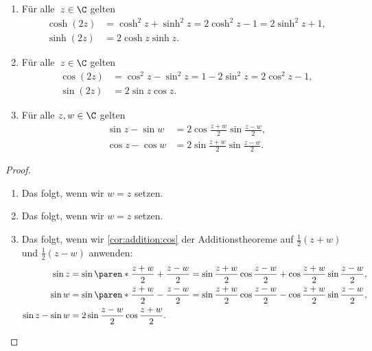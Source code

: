 \documentclass[a4paper]{article}
\begin{document}
\begin{corollary}[Doopelwinkelfunktionen]\leavevmode
    \begin{enumerate}
        \item Für alle~$z \in \C$ gelten
              \begin{align*}
                  \cosh(2z) & = \cosh^2z + \sinh^2z = 2\cosh^2z - 1 = 2\sinh^2z + 1, \\
                  \sinh(2z) & = 2\cosh z\sinh z.
              \end{align*}
        \item Für alle~$z \in \C$ gelten
              \begin{align*}
                  \cos(2z) & = \cos^2z - \sin^2z = 1 - 2\sin^2z = 2\cos^2z - 1, \\
                  \sin(2z) & = 2\sin z\cos z.
              \end{align*}
        \item Für alle $z,w \in \C$ gelten
              \begin{align*}
                  \sin z - \sin w & = 2 \cos\frac{z+w}{2} \sin\frac{z-w}{2}, \\
                  \cos z - \cos w & = 2 \sin\frac{z+w}{2} \sin\frac{z-w}{2}.
              \end{align*}
    \end{enumerate}
\end{corollary}

\begin{proof}\leavevmode
    \begin{enumerate}
        \item Das folgt, wenn wir $w = z$ setzen.
        \item Das folgt, wenn wir $w = z$ setzen.
        \item Das folgt, wenn wir \cref{cor:addition:cos} der Additionstheoreme auf $\frac{1}{2}(z+w)$ und $\frac{1}{2}(z-w)$ anwenden:
              \begin{align*}
                  \sin z          & = \sin\paren*{\frac{z+w}{2}+\frac{z-w}{2}} = \sin\frac{z+w}{2}\cos\frac{z-w}{2} + \cos\frac{z+w}{2}\sin\frac{z-w}{2}, \\
                  \sin w          & = \sin\paren*{\frac{z+w}{2}-\frac{z-w}{2}} = \sin\frac{z+w}{2}\cos\frac{z-w}{2} - \cos\frac{z+w}{2}\sin\frac{z-w}{2}, \\
                  \sin z - \sin w & = 2 \sin\frac{z-w}{2} \cos\frac{z+w}{2}. \qedhere
              \end{align*}
    \end{enumerate}
\end{proof}
\end{document}
